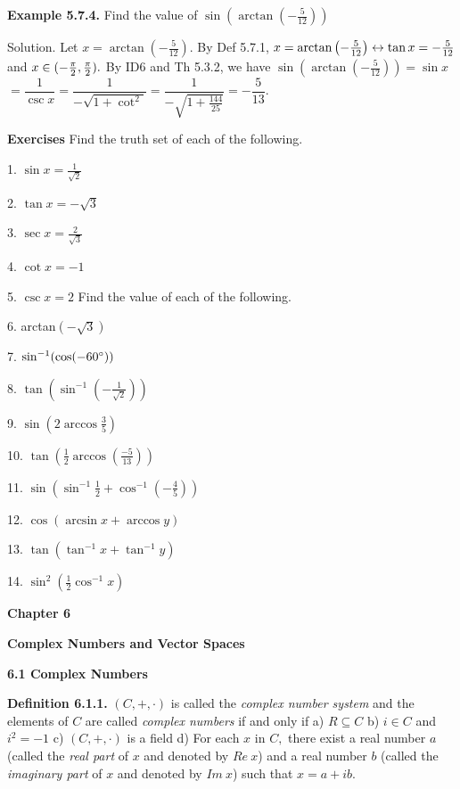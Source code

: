 \textbf{Example 5.7.4.} Find the value of $\sin\left(\arctan\left(-\frac{5}{12}\right)\right) $\nl

Solution. Let $x = \arctan\left(-\frac{5}{12}\right).$ By Def 5.7.1, $x = \arctan\left(-\frac{5}{12}\right) \leftrightarrow \tan x = -\frac{5}{12}$ and $x \in (-\frac{\pi}{2}, \frac{\pi}{2}).$   By ID6 and Th 5.3.2, we have $\sin\left(\arctan\left(-\frac{5}{12}\right)\right) = \sin x$\nl
 $= \dfrac{1}{\csc x} = \dfrac{1}{-\sqrt{1 + \cot^{2}}} = \dfrac{1}{-\sqrt{1 + \frac{144}{25}}} = -\dfrac{5}{13}.$

\textbf{Exercises}\nl
Find the truth set of each of the following. \nl

1. $\sin x = \frac{1}{\sqrt{2}}$ \nl

2. $\tan x= -\sqrt{3}$\nl

3. $\sec x =\frac{2}{\sqrt{3}}$ \nl		

4. $\cot x= -1$ \nl

5. $\csc x = 2$\nl
 Find the value of each of the following. \nl

6. arctan$(-\sqrt{3})$ \nl

7. $\sin^{-1} (\cos(-60^{\circ}))$ \nl

8. $\tan(\sin^{-1}(-\frac{1}{\sqrt{2}}))$ \nl

9. $\sin(2\arccos \frac{3}{5})$ \nl

10. $\tan\left( \frac{1}{2}\arccos (\frac{-5}{13})\right)$

\newpage


11. $\sin\left(\sin^{-1} \frac{1}{2} + \cos^{-1}(-\frac{4}{5})\right) $\nl

12. $\cos(\arcsin x + \arccos y)$\nl

13. $\tan(\tan^{-1} x + \tan^{-1} y)$\nl

14. $\sin^{2} (\frac{1}{2}\cos^{-1} x)$\nl


\newpage
\textbf{Chapter 6}\nl

\textbf{Complex Numbers and Vector Spaces}\nl

\textbf{6.1 Complex Numbers }\nl

\textbf{Definition 6.1.1.} $(C,+,\cdot)$ is called the \textit{complex number system} and the elements of $C$ are called \textit{complex numbers} if and only if \nl
a) $R\subseteq C$\nl
b) $i\in C$ and $i^{2}=-1$\nl
c) $(C,+,\cdot)$ is a field \nl
d) For each $x$ in $C,$ there exist a real number $a$ (called the \textit{real
part} of $x$ and denoted by $Re~x$) and a real number $b$ (called the \textit{imagin­ary part} of $x$ and denoted by $Im~ x$) such that $x = a + ib.$ \nl

